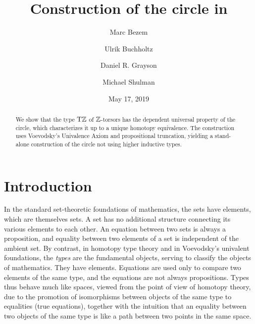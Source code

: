 \documentclass[a4paper,12pt]{amsart}
\begin{document}
\title{Construction of the circle in \UniMath}
{
    \author{Marc Bezem}
    \address{Department of Informatics, University of Bergen}
}
{
    \author{Ulrik Buchholtz}
    \address{Department of Mathematics, Technische Universit\"at Darmstadt}
}
{
    \author{Daniel R. Grayson}
}
{
    \author{Michael Shulman}
    \address{Department of Mathematics, University of San Diego}
}

\date{May 17, 2019}

\begin{abstract}
We show that the type ${\mathrm{T}\mathbb{Z}}$ of $\mathbb{Z}$-torsors has the dependent universal property of the circle,
which characterizes it up to a unique homotopy equivalence.
The construction uses Voevodsky's Univalence Axiom and propositional truncation,
yielding a stand-alone construction of the
circle not using higher inductive types.
\end{abstract}

\maketitle
{}
\tableofcontents

\section{Introduction}

In the standard set-theoretic foundations of mathematics, the sets have elements, which are themselves sets.  A set has no additional structure
connecting its various elements to each other.  An equation between two sets is always a proposition, and equality between two elements of a set
is independent of the ambient set.  By contrast, in homotopy type theory and in Voevodsky's univalent foundations, the \emph{types} are the
fundamental objects, serving to classify the objects of mathematics.  They have elements.  Equations are used only to compare two elements of
the same type, and the equations are not always propositions.  Types thus behave much like spaces, viewed from the point of view of homotopy
theory, due to the promotion of isomorphisms between objects of the same type to equalities (true equations), together with the intuition that
an equality between two objects of the same type is like a path between two points in the same space.
\end{document}
